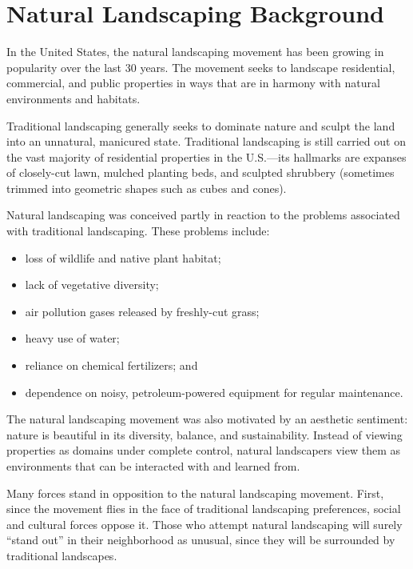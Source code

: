 \documentclass[12pt]{article}
\begin{document}
\newpage




\tableofcontents

\newpage

\section{Natural Landscaping Background}

In the United States, the natural landscaping movement has been growing in popularity over the last 30 years.
The movement seeks to landscape residential, commercial, and public properties in ways that are in harmony with natural environments and habitats.

Traditional landscaping generally seeks to dominate nature and sculpt the land into an unnatural, manicured state.
Traditional landscaping is still carried out on the vast majority of residential properties in the U.S.---its hallmarks are expanses of closely-cut lawn, mulched planting beds, and sculpted shrubbery (sometimes trimmed into geometric shapes such as cubes and cones).     

Natural landscaping was conceived partly in reaction to the problems associated with traditional landscaping.
These problems include:
\begin{itemize}
\item loss of wildlife and native plant habitat;  
\item lack of vegetative diversity;  
\item air pollution gases released by freshly-cut grass;  
\item heavy use of water;  
\item reliance on chemical fertilizers; and
\item dependence on noisy, petroleum-powered equipment for regular maintenance.
\end{itemize}
The natural landscaping movement was also motivated by an aesthetic sentiment:  nature is beautiful in its diversity, balance, and sustainability.
Instead of viewing properties as domains under complete control, natural landscapers view them as environments that can be interacted with and learned from. 

Many forces stand in opposition to the natural landscaping movement.
First, since the movement flies in the face of traditional landscaping preferences, social and cultural forces oppose it.
Those who attempt natural landscaping will surely ``stand out'' in their neighborhood as unusual, since they will be surrounded by traditional landscapes.
\end{document}
